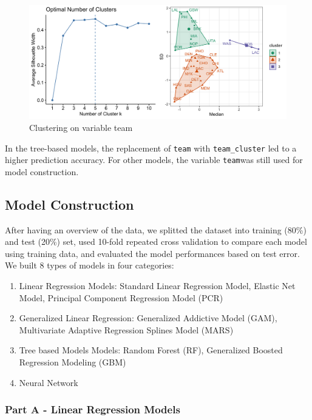 \documentclass[
]{article}
\begin{document}
\begin{figure}
\centering
\includegraphics{report_figures/figure_tree_1.png}
\caption{Clustering on variable team}
\end{figure}

In the tree-based models, the replacement of \texttt{team} with
\texttt{team\_cluster} led to a higher prediction accuracy. For other
models, the variable \texttt{team}was still used for model construction.

\hypertarget{model-construction}{%
\subsection{Model Construction}\label{model-construction}}

After having an overview of the data, we splitted the dataset into
training (80\%) and test (20\%) set, used 10-fold repeated cross
validation to compare each model using training data, and evaluated the
model performances based on test error. We built 8 types of models in
four categories:

\begin{enumerate}
\def\labelenumi{\arabic{enumi}.}
\item
  Linear Regression Models: Standard Linear Regression Model, Elastic
  Net Model, Principal Component Regression Model (PCR)
\item
  Generalized Linear Regression: Generalized Addictive Model (GAM),
  Multivariate Adaptive Regression Splines Model (MARS)
\item
  Tree based Models Models: Random Forest (RF), Generalized Boosted
  Regression Modeling (GBM)
\item
  Neural Network
\end{enumerate}

\hypertarget{part-a---linear-regression-models}{%
\subsubsection{Part A - Linear Regression
Models}\label{part-a---linear-regression-models}}
\end{document}
